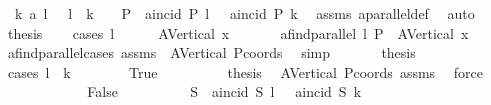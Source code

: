 \begin{isabellebody}
\ {}{\isacharcolon}{\kern0pt}\ {\isachardoublequoteopen}k\ a{}{\isacharbar}{\kern0pt}{\isacharbar}{\kern0pt}\ l\ {\isacharequal}{\kern0pt}\ \ {\isacharparenleft}{\kern0pt}l\ {\isacharequal}{\kern0pt}\ k\ {\isasymor}\ \ {\isacharparenleft}{\kern0pt}{\isasymforall}\ P{\isachardot}{\kern0pt}\ {\isacharparenleft}{\kern0pt}{\isasymnot}\ a{}incid\ P\ l{\isacharparenright}{\kern0pt}\ \ {\isasymor}\ {\isacharparenleft}{\kern0pt}{\isasymnot}a{}incid\ P\ k{\isacharparenright}{\kern0pt}{\isacharparenright}{\kern0pt}{\isacharparenright}{\kern0pt}{\isachardoublequoteclose}\ \isamarkupfalse%
\ assms\ a{}parallel{\isacharunderscore}{\kern0pt}def\ \isamarkupfalse%
\ auto\isanewline
\ \ \isamarkupfalse%
\ {\isacharquery}{\kern0pt}thesis\isanewline
\ \ \isamarkupfalse%
\ {\isacharparenleft}{\kern0pt}cases\ l{\isacharparenright}{\kern0pt}\isanewline
\ \ \ \ \isamarkupfalse%
\ {\isacharparenleft}{\kern0pt}A{}Vertical\ x{}{\isacharparenright}{\kern0pt}\isanewline
\ \ \ \ \isamarkupfalse%
\ {}{\isacharcolon}{\kern0pt}\ {\isachardoublequoteopen}a{}find{\isacharunderscore}{\kern0pt}parallel\ l\ P\ {\isacharequal}{\kern0pt}\ A{}Vertical\ x{}{\isachardoublequoteclose}\ \isamarkupfalse%
\ a{}find{\isacharunderscore}{\kern0pt}parallel{\isachardot}{\kern0pt}cases\ assms\ \ A{}Vertical\ Pcoords\ \isamarkupfalse%
\ simp\ \isanewline
\ \ \ \ \isamarkupfalse%
\ {\isacharquery}{\kern0pt}thesis\isanewline
\ \ \ \ \isamarkupfalse%
\ {\isacharparenleft}{\kern0pt}cases\ {\isachardoublequoteopen}l\ {\isacharequal}{\kern0pt}\ k{\isachardoublequoteclose}{\isacharparenright}{\kern0pt}\isanewline
\ \ \ \ \ \ \isamarkupfalse%
\ True\isanewline
\ \ \ \ \ \ \isamarkupfalse%
\ \isamarkupfalse%
\ {\isacharquery}{\kern0pt}thesis\ \isamarkupfalse%
\ A{}Vertical\ Pcoords\ assms{\isacharparenleft}{\kern0pt}{}{\isacharparenright}{\kern0pt}\ \isamarkupfalse%
\ force\isanewline
\ \ \ \ \isamarkupfalse%
\isanewline
\ \ \ \ \ \ \isamarkupfalse%
\ False\isanewline
\ \ \ \ \ \ \isamarkupfalse%
\ {}{\isacharcolon}{\kern0pt}\ {\isachardoublequoteopen}{\isasymforall}\ S{\isachardot}{\kern0pt}\ {\isacharparenleft}{\kern0pt}{\isasymnot}\ a{}incid\ S\ l{\isacharparenright}{\kern0pt}\ \ {\isasymor}\ {\isacharparenleft}{\kern0pt}{\isasymnot}a{}incid\ S\ k{\isacharparenright}{\kern0pt}{\isachardoublequoteclose}\ \isamarkupfalse%

\end{isabellebody}

